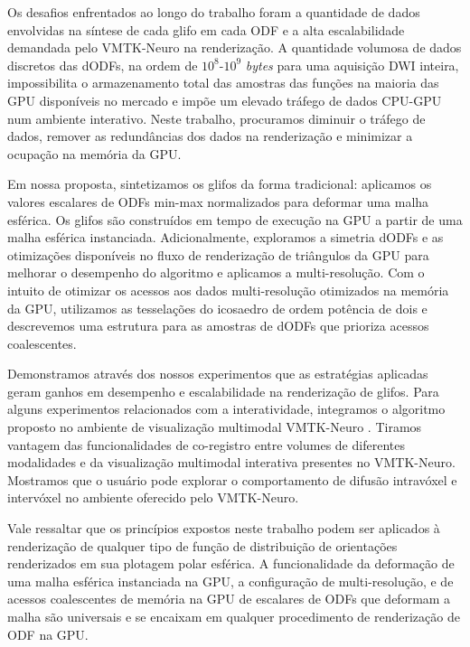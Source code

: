 \documentclass[
    12pt,                %
    oneside,            %
    a4paper,            %
    english,            %
    french,                %
    spanish,            %
    brazil                %
    ]{abntex2}
\begin{document}
Os desafios enfrentados ao longo do trabalho foram a quantidade de dados envolvidas na síntese de cada glifo em cada ODF e a alta escalabilidade demandada pelo VMTK-Neuro na renderização. A quantidade volumosa de dados discretos das dODFs, na ordem de $10^8$-$10^9$ \textit{bytes} para uma aquisição DWI inteira, impossibilita o armazenamento total das amostras das funções na maioria das GPU disponíveis no mercado e impõe um elevado tráfego de dados CPU-GPU num ambiente interativo. Neste trabalho, procuramos diminuir o tráfego de dados, remover as redundâncias dos dados na renderização e minimizar a ocupação na memória da GPU.

Em nossa proposta, sintetizamos os glifos da forma tradicional: aplicamos os valores escalares de ODFs min-max normalizados para deformar uma malha esférica. Os glifos são construídos em tempo de execução na GPU a partir de uma malha esférica instanciada. Adicionalmente, exploramos a simetria dODFs e as otimizações disponíveis no fluxo de renderização de triângulos da GPU para melhorar o desempenho do algoritmo e aplicamos a multi-resolução.
Com o intuito de otimizar os acessos aos dados multi-resolução otimizados na memória da GPU, utilizamos as tesselações do icosaedro de ordem potência de dois e descrevemos uma estrutura para as amostras de dODFs que prioriza acessos coalescentes.

Demonstramos através dos nossos experimentos que as estratégias aplicadas geram ganhos em desempenho e escalabilidade na renderização de glifos. Para alguns experimentos relacionados com a interatividade, 
integramos o algoritmo proposto no ambiente de visualização multimodal VMTK-Neuro \cite{VMTKNeuro}. Tiramos vantagem das funcionalidades de co-registro entre volumes de diferentes modalidades \cite{ting2014} e da visualização multimodal interativa presentes no VMTK-Neuro. Mostramos que o usuário pode explorar o comportamento de difusão intravóxel e intervóxel no ambiente oferecido pelo VMTK-Neuro.

Vale ressaltar que os princípios expostos neste trabalho podem ser aplicados à renderização de qualquer tipo de função de distribuição de orientações renderizados em sua plotagem polar esférica. A funcionalidade da deformação de uma malha esférica instanciada na GPU, a configuração de multi-resolução, e de acessos coalescentes de memória na GPU de escalares de ODFs que deformam a malha são universais e se encaixam em qualquer procedimento de renderização de ODF na GPU.
\end{document}

